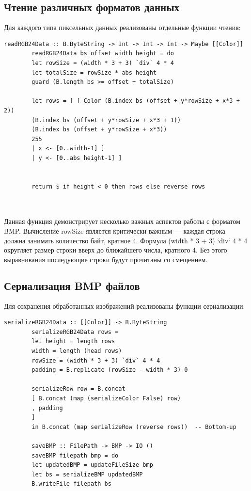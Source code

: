 \documentclass[a4paper,12pt]{article}
\begin{document}
	\subsection{Чтение различных форматов данных}
	
	Для каждого типа пиксельных данных реализованы отдельные функции чтения:
	
	\begin{lstlisting}[caption=Чтение 24-битных RGB данных, label=lst:read-rgb24]
		readRGB24Data :: B.ByteString -> Int -> Int -> Int -> Maybe [[Color]]
		readRGB24Data bs offset width height = do
		let rowSize = (width * 3 + 3) `div` 4 * 4 
		let totalSize = rowSize * abs height
		guard (B.length bs >= offset + totalSize)
		
		let rows = [ [ Color (B.index bs (offset + y*rowSize + x*3 + 2))
		(B.index bs (offset + y*rowSize + x*3 + 1))
		(B.index bs (offset + y*rowSize + x*3))
		255
		| x <- [0..width-1] ]
		| y <- [0..abs height-1] ]
		

		return $ if height < 0 then rows else reverse rows
		
		
	\end{lstlisting}
	
	Данная функция демонстрирует несколько важных аспектов работы с форматом BMP. Вычисление rowSize является критически важным — каждая строка должна занимать количество байт, кратное 4. Формула (width * 3 + 3) `div` 4 * 4 округляет размер строки вверх до ближайшего числа, кратного 4. Без этого выравнивания последующие строки будут прочитаны со смещением.
	
	\subsection{Сериализация BMP файлов}
	
	Для сохранения обработанных изображений реализованы функции сериализации:
	
	\begin{lstlisting}[caption=Сериализация BMP файлов, label=lst:serialize-bmp]
		serializeRGB24Data :: [[Color]] -> B.ByteString
		serializeRGB24Data rows =
		let height = length rows
		width = length (head rows)
		rowSize = (width * 3 + 3) `div` 4 * 4
		padding = B.replicate (rowSize - width * 3) 0
		
		serializeRow row = B.concat
		[ B.concat (map (serializeColor False) row)
		, padding
		]
		in B.concat (map serializeRow (reverse rows))  -- Bottom-up
		
		saveBMP :: FilePath -> BMP -> IO ()
		saveBMP filepath bmp = do
		let updatedBMP = updateFileSize bmp
		let bs = serializeBMP updatedBMP
		B.writeFile filepath bs
	\end{lstlisting}
	
\end{document}

